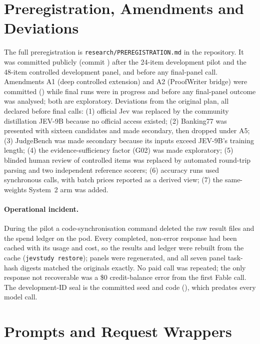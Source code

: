 \section{Preregistration, Amendments and Deviations}
\label{app:prereg}
The full preregistration is \texttt{research/PREREGISTRATION.md} in the repository.
It was committed publicly (commit ) after the 24-item development pilot and the 48-item controlled development panel, and before any final-panel call.
Amendments A1 (deep controlled extension) and A2 (ProofWriter bridge) were committed () while final runs were in progress and before any final-panel outcome was analysed; both are exploratory.
Deviations from the original plan, all declared before final calls:
(1) official Jev was replaced by the community distillation JEV-9B because no official access existed;
(2) Banking77 was presented with sixteen candidates and made secondary, then dropped under A5;
(3) JudgeBench was made secondary because its inputs exceed JEV-9B's training length;
(4) the evidence-sufficiency factor (G02) was made exploratory;
(5) blinded human review of controlled items was replaced by automated round-trip parsing and two independent reference scorers;
(6) accuracy runs used synchronous calls, with batch prices reported as a derived view;
(7) the same-weights System~2 arm was added.

\paragraph{Operational incident.}
During the pilot a code-synchronisation command deleted the raw result files and the spend ledger on the pod.
Every completed, non-error response had been cached with its usage and cost, so the results and ledger were rebuilt from the cache (\texttt{jevstudy restore}); panels were regenerated, and all seven panel task-hash digests matched the originals exactly.
No paid call was repeated; the only response not recoverable was a \$0 credit-balance error from the first Fable call.
The development-ID seal is the committed seed and code (), which predates every model call.

\section{Prompts and Request Wrappers}
\label{app:prompts}
